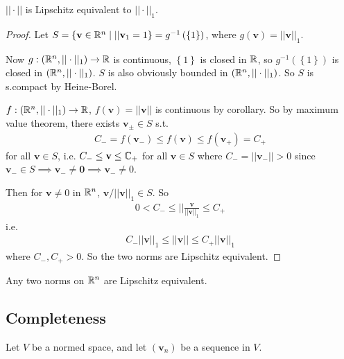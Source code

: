 \documentclass[a4paper]{article}
\begin{document}
\begin{thm}
$||\cdot||$ is Lipschitz equivalent to $||\cdot||_1$.
\begin{proof}
Let $S = \left\{\mathbf{v}\in\mathbb{R}^n \mid ||\mathbf{v}_1 = 1\right\} = g^{-1}\left(\left\{1\right\}\right)$, where $g\left(\mathbf{v}\right) = ||\mathbf{v}||_1$.

Now $g:\left(\mathbb{R}^n,||\cdot||_1\right) \to \mathbb{R}$ is continuous, $\left\{1\right\}$ is closed in $\mathbb{R}$, so $g^{-1}\left(\left\{1\right\}\right)$ is closed in $\left(\mathbb{R}^n,||\cdot||_1\right)$. $S$ is also obviously bounded in $\left(\mathbb{R}^n,||\cdot||_1\right)$. So $S$ is s.compact by Heine-Borel.

$f:\left(\mathbb{R}^n,||\cdot||_1\right) \to \mathbb{R}$, $f\left(\mathbf{v}\right) = ||\mathbf{v}||$ is continuous by corollary. So by maximum value theorem, there exists $\mathbf{v_\pm} \in S$ s.t.
\begin{equation*}
\begin{aligned}
C_- = f\left(\mathbf{v}_-\right) \leq f\left(\mathbf{v}\right) \leq f\left(\mathbf{v}_+\right) = C_+
\end{aligned}
\end{equation*}
for all $\mathbf{v} \in S$, i.e. $C_- \leq \mathbf{v} \leq \mathbb{C}_+$ for all $\mathbf{v} \in S$ where $C_- = ||\mathbf{v}_-||>0$ since $\mathbf{v}_- \in S \implies \mathbf{v_-} \neq \mathbf{0} \implies \mathbf{v_-} \neq 0$.

Then for $\mathbf{v} \neq 0$ in $\mathbb{R}^n$, $\mathbf{v}/||\mathbf{v}||_1 \in S$. So
\begin{equation*}
\begin{aligned}
0 < C_- \leq ||\frac{\mathbf{v}}{||\mathbf{v}||_1} \leq C_+
\end{aligned}
\end{equation*}
i.e.
\begin{equation*}
\begin{aligned}
C_-||\mathbf{v}||_1 \leq ||\mathbf{v}|| \leq C_+ ||\mathbf{v}||_1
\end{aligned}
\end{equation*}
where $C_-,C_+ > 0$. So the two norms are Lipschitz equivalent.
\end{proof}
\end{thm}

\begin{coro}
Any two norms on $\mathbb{R}^n$ are Lipschitz equivalent.
\end{coro}

\subsection{Completeness}
Let $V$ be a normed space, and let $\left(\mathbf{v}_n\right)$ be a sequence in $V$.
\end{document}
